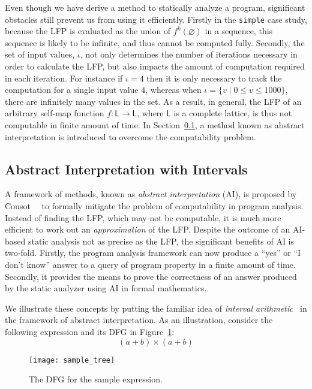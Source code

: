 Even though we have derive a method to statically analyze a program,
significant obstacles still prevent us from using it efficiently.  Firstly
in the \verb|simple| case study, because the LFP is evaluated as the union
of $f^k(\varnothing)$ in a sequence, this sequence is likely to be infinite,
and thus cannot be computed fully.  Secondly, the set of input values,
$\iota$, not only determines the number of iterations necessary in order to
calculate the LFP, but also impacts the amount of computation required in
each iteration.  For instance if $\iota = {4}$ then it is only necessary to
track the computation for a single input value $4$, whereas when $\iota =
\{ v \mid 0 \leq v \leq 1000 \}$, there are infinitely many values in the
set.  As a result, in general, the LFP of an arbitrary self-map function $f:
\mathsf{L} \to \mathsf{L}$, where $\mathsf{L}$ is a complete lattice, is thus
not computable in finite amount of time.  In Section~\ref{bg:sub:intervals},
a method known as abstract interpretation is introduced to overcome the
computability problem.


\subsection{Abstract Interpretation with Intervals}
\label{bg:sub:intervals}

A framework of methods, known as \emph{abstract interpretation} (AI), is
proposed by Cousot~\etal~\cite{cousot77} to formally mitigate the problem of
computability in program analysis.  Instead of finding the LFP, which may not
be computable, it is much more efficient to work out an \emph{approximation} of
the LFP\@.  Despite the outcome of an AI-based static analysis not as precise
as the LFP, the significant benefits of AI is two-fold.  Firstly, the program
analysis framework can now produce a ``yes'' or ``I don't know'' answer to a
query of program property in a finite amount of time.  Secondly, it provides
the means to prove the correctness of an answer produced by the static analyzer
using AI in formal mathematics.

We illustrate these concepts by putting the familiar idea of \emph{interval
arithmetic}~\cite{moore} in the framework of abstract interpretation. As
an illustration, consider the following expression and its DFG in
Figure~\ref{bg:fig:sample_tree}\@:
\begin{equation}
    (a + b) \times (a + b)
    \label{bg:eq:absint_sample}
\end{equation}
\begin{figure}[ht]
    \centering
    \texttt{[image: sample\_tree]}
    \caption{The DFG for the sample expression.}\label{bg:fig:sample_tree}
\end{figure}

